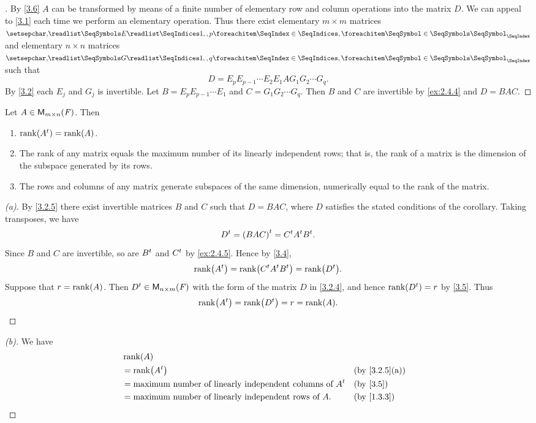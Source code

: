 \begin{proof}[]
	By \cref{3.6} \(A\) can be transformed by means of a finite number of elementary row and column operations into the matrix \(D\).
	We can appeal to \cref{3.1} each time we perform an elementary operation.
	Thus there exist elementary \(m \times m\) matrices \(\seq{E}{1,,p}\) and elementary \(n \times n\) matrices \(\seq{G}{1,,q}\) such that
	\[
		D = E_p E_{p - 1} \cdots E_2 E_1 A G_1 G_2 \cdots G_q.
	\]
	By \cref{3.2} each \(E_j\) and \(G_j\) is invertible.
	Let \(B = E_p E_{p - 1} \cdots E_1\) and \(C = G_1 G_2 \cdots G_q\).
	Then \(B\) and \(C\) are invertible by \cref{ex:2.4.4} and \(D = BAC\).
\end{proof}

\begin{cor}\label{3.2.5}
	Let \(A \in \ms\).
	Then
	\begin{enumerate}
		\item \(\rk{\tp{A}} = \rk{A}\).
		\item The rank of any matrix equals the maximum number of its linearly independent rows;
		      that is, the rank of a matrix is the dimension of the subspace generated by its rows.
		\item The rows and columns of any matrix generate subspaces of the same dimension, numerically equal to the rank of the matrix.
	\end{enumerate}
\end{cor}

\begin{proof}[(a)]
	By \cref{3.2.5} there exist invertible matrices \(B\) and \(C\) such that \(D = BAC\), where \(D\) satisfies the stated conditions of the corollary.
	Taking transposes, we have
	\[
		{D}^{t} = {\left\lparen BAC\right\rparen}^{t} = {C}^{t} {A}^{t} {B}^{t}.
	\]
	Since \(B\) and \(C\) are invertible, so are \({B}^{t}\) and \({C}^{t}\) by \cref{ex:2.4.5}.
	Hence by \cref{3.4},
	\[
		\rk{\tp{A}} = \rk{\tp{C} \tp{A} \tp{B}} = \rk{\tp{D}}.
	\]
	Suppose that \(r = \rk{A}\).
	Then \(\tp{D} \in \ms[n][m][\F]\) with the form of the matrix \(D\) in \cref{3.2.4}, and hence \(\rk{\tp{D}} = r\) by \cref{3.5}.
	Thus
	\[
		\rk{\tp{A}} = \rk{\tp{D}} = r = \rk{A}.
	\]
\end{proof}

\begin{proof}[(b)]
	We have
	\begin{align*}
		 & \rk{A}                                                                                \\
		 & = \rk{\tp{A}}                                                      &  & \by{3.2.5}[a] \\
		 & = \text{maximum number of linearly independent columns of } \tp{A} &  & \by{3.5}      \\
		 & = \text{maximum number of linearly independent rows of } A.        &  & \by{1.3.3}
	\end{align*}
\end{proof}

